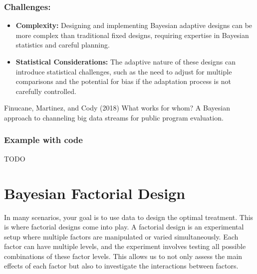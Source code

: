 \documentclass[
  letterpaper,
  DIV=11,
  numbers=noendperiod]{scrreprt}
\begin{document}
\subsection*{Challenges:}\label{challenges}

\begin{itemize}
\item
  \textbf{Complexity:} Designing and implementing Bayesian adaptive
  designs can be more complex than traditional fixed designs, requiring
  expertise in Bayesian statistics and careful planning.
\item
  \textbf{Statistical Considerations:} The adaptive nature of these
  designs can introduce statistical challenges, such as the need to
  adjust for multiple comparisons and the potential for bias if the
  adaptation process is not carefully controlled.
\end{itemize}

\begin{tcolorbox}[enhanced jigsaw, colframe=quarto-callout-tip-color-frame, left=2mm, toprule=.15mm, colbacktitle=quarto-callout-tip-color!10!white, title=\textcolor{quarto-callout-tip-color}{\faLightbulb}\hspace{0.5em}{Learn more}, coltitle=black, rightrule=.15mm, leftrule=.75mm, colback=white, arc=.35mm, bottomtitle=1mm, bottomrule=.15mm, breakable, titlerule=0mm, opacitybacktitle=0.6, toptitle=1mm, opacityback=0]

Finucane, Martinez, and Cody (2018) What works for whom? A Bayesian
approach to channeling big data streams for public program evaluation.

\end{tcolorbox}

\subsection{Example with code}\label{example-with-code-2}

TODO

\chapter{Bayesian Factorial Design}\label{bayesian-factorial-design}

In many scenarios, your goal is to use data to design the optimal
treatment. This is where factorial designs come into play. A factorial
design is an experimental setup where multiple factors are manipulated
or varied simultaneously. Each factor can have multiple levels, and the
experiment involves testing all possible combinations of these factor
levels. This allows us to not only assess the main effects of each
factor but also to investigate the interactions between factors.
\end{document}
